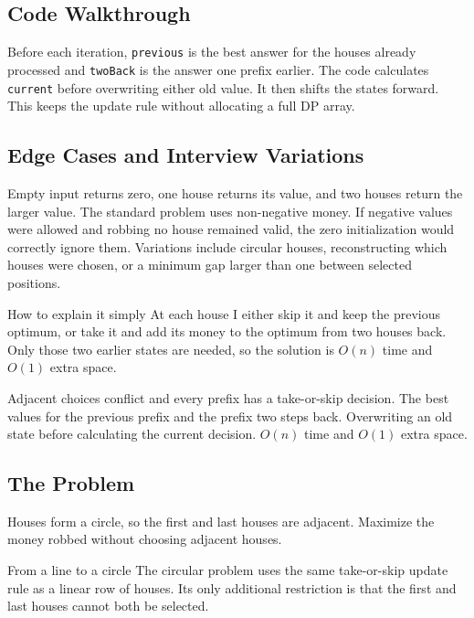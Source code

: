\subsection{Code Walkthrough}
Before each iteration, \texttt{previous} is the best answer for the houses
already processed and \texttt{twoBack} is the answer one prefix earlier. The
code calculates \texttt{current} before overwriting either old value. It then
shifts the states forward. This keeps the update rule without allocating a
full DP array.

\subsection{Edge Cases and Interview Variations}
Empty input returns zero, one house returns its value, and two houses return
the larger value. The standard problem uses non-negative money. If negative
values were allowed and robbing no house remained valid, the zero
initialization would correctly ignore them. Variations include circular
houses, reconstructing which houses were chosen, or a minimum gap larger than
one between selected positions.

\begin{revisionbox}{How to explain it simply}
At each house I either skip it and keep the previous optimum, or take it
and add its money to the optimum from two houses back. Only those two earlier
states are needed, so the solution is \(O(n)\) time and \(O(1)\) extra space.
\end{revisionbox}
\chaptercheckpoint
  {Adjacent choices conflict and every prefix has a take-or-skip decision.}
  {The best values for the previous prefix and the prefix two steps back.}
  {Overwriting an old state before calculating the current decision.}
  {$O(n)$ time and $O(1)$ extra space.}
\judgeclassnote



\subsection{The Problem}
Houses form a circle, so the first and last houses are adjacent. Maximize the
money robbed without choosing adjacent houses.

\begin{conceptbox}{From a line to a circle}
The circular problem uses the same take-or-skip update rule as a linear row of
houses. Its only additional restriction is that the first and last houses
cannot both be selected.
\end{conceptbox}

